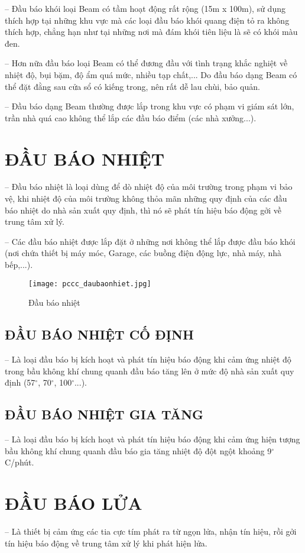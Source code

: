 -- Đầu báo khói loại Beam có tầm hoạt động rất rộng (15m x 100m), sử dụng thích hợp tại những khu vực mà các loại đầu báo khói quang điện tỏ ra không thích hợp, chẳng hạn như tại những nơi mà đám khói tiên liệu là sẽ có khói màu đen.

-- Hơn nữa đầu báo loại Beam có thể đương đầu với tình trạng khắc nghiệt về nhiệt độ, bụi bặm, độ ẩm quá mức, nhiều tạp chất,... Do đầu báo dạng Beam có thể đặt đằng sau cửa sổ có kiếng trong, nên rất dễ lau chùi, bảo quản.

-- Đầu báo dạng Beam thường được lắp trong khu vực có phạm vi giám sát lớn, trần nhà quá cao không thể lắp các đầu báo điểm (các nhà xưởng...).

\section{ĐẦU BÁO NHIỆT}
-- Đầu báo nhiệt là loại dùng để dò nhiệt độ của môi trường trong phạm vi bảo vệ, khi nhiệt độ của môi trường không thỏa mãn những quy định của các đầu báo nhiệt do nhà sản xuất quy định, thì nó sẽ phát tín hiệu báo động gởi về trung tâm xử lý.

-- Các đầu báo nhiệt được lắp đặt ở những nơi không thể lắp được đầu báo khói (nơi chứa thiết bị máy móc, Garage, các buồng điện động lực, nhà máy, nhà bếp,...).

\begin{figure}[H]
	\centering
	\texttt{[image: pccc\_daubaonhiet.jpg]}
	\caption{Đầu báo nhiệt}
\end{figure}

\subsection{ĐẦU BÁO NHIỆT CỐ ĐỊNH}
-- Là loại đầu báo bị kích hoạt và phát tín hiệu báo động khi cảm ứng nhiệt độ trong bầu không khí chung quanh đầu báo tăng lên ở mức độ nhà sản xuất quy định (57$^{\circ}$, 70$^{\circ}$, 100$^{\circ}$...).
\subsection{ĐẦU BÁO NHIỆT GIA TĂNG}
-- Là loại đầu báo bị kích hoạt và phát tín hiệu báo động khi cảm ứng hiện tượng bầu không khí chung quanh đầu báo gia tăng nhiệt độ đột ngột khoảng 9$^{\circ}$C/phút.

\section{ĐẦU BÁO LỬA}
-- Là thiết bị cảm ứng các tia cực tím phát ra từ ngọn lửa, nhận tín hiệu, rồi gởi tín hiệu báo động về trung tâm xử lý khi phát hiện lửa.


